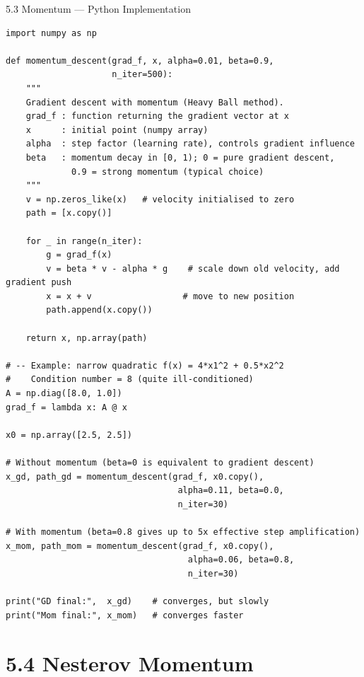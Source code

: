 \documentclass[aspectratio=169,10pt]{beamer}
\begin{document}
\begin{frame}[fragile]{5.3 Momentum --- Python Implementation}
\begin{lstlisting}[caption={Gradient Descent with Momentum (Python/NumPy)}]
import numpy as np

def momentum_descent(grad_f, x, alpha=0.01, beta=0.9,
                     n_iter=500):
    """
    Gradient descent with momentum (Heavy Ball method).
    grad_f : function returning the gradient vector at x
    x      : initial point (numpy array)
    alpha  : step factor (learning rate), controls gradient influence
    beta   : momentum decay in [0, 1); 0 = pure gradient descent,
             0.9 = strong momentum (typical choice)
    """
    v = np.zeros_like(x)   # velocity initialised to zero
    path = [x.copy()]

    for _ in range(n_iter):
        g = grad_f(x)
        v = beta * v - alpha * g    # scale down old velocity, add gradient push
        x = x + v                  # move to new position
        path.append(x.copy())

    return x, np.array(path)

# -- Example: narrow quadratic f(x) = 4*x1^2 + 0.5*x2^2
#    Condition number = 8 (quite ill-conditioned)
A = np.diag([8.0, 1.0])
grad_f = lambda x: A @ x

x0 = np.array([2.5, 2.5])

# Without momentum (beta=0 is equivalent to gradient descent)
x_gd, path_gd = momentum_descent(grad_f, x0.copy(),
                                  alpha=0.11, beta=0.0,
                                  n_iter=30)

# With momentum (beta=0.8 gives up to 5x effective step amplification)
x_mom, path_mom = momentum_descent(grad_f, x0.copy(),
                                    alpha=0.06, beta=0.8,
                                    n_iter=30)

print("GD final:",  x_gd)    # converges, but slowly
print("Mom final:", x_mom)   # converges faster
\end{lstlisting}
\end{frame}

\section{5.4 Nesterov Momentum}
\end{document}
